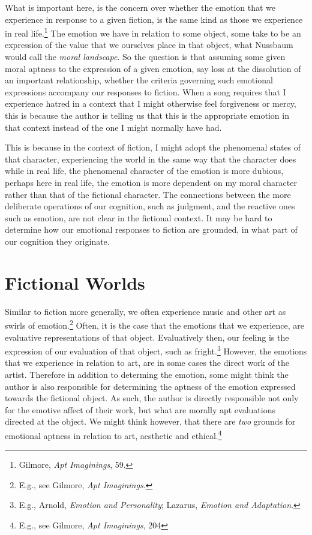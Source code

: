 \documentclass[phdthesis,12pt,final]{wuthesis}
\theoremstyle{definition}
\theoremstyle{definition}
\theoremstyle{definition}
\theoremstyle{definition}
\theoremstyle{remark}
\begin{document}
What is important here, is the concern over whether the emotion that we experience in response to a given fiction, is the same kind as those we experience in real life.\footnote{Gilmore, \emph{Apt {Imaginings}}, 59.} The emotion we have in relation to some object, some take to be an expression of the value that we ourselves place in that object, what Nussbaum would call the \emph{moral landscape}. So the question is that assuming some given moral aptness to the expression of a given emotion, say loss at the dissolution of an important relationship, whether the criteria governing such emotional expressions accompany our responses to fiction. When a song requires that I experience hatred in a context that I might otherwise feel forgiveness or mercy, this is because the author is telling us that this is the appropriate emotion in that context instead of the one I might normally have had.

This is because in the context of fiction, I might adopt the phenomenal states of that character, experiencing the world in the same way that the character does while in real life, the phenomenal character of the emotion is more dubious, perhaps here in real life, the emotion is more dependent on my moral character rather than that of the fictional character. The connections between the more deliberate operations of our cognition, such as judgment, and the reactive ones such as emotion, are not clear in the fictional context. It may be hard to determine how our emotional responses to fiction are grounded, in what part of our cognition they originate.

\section{Fictional Worlds}\label{fictional-worlds}

Similar to fiction more generally, we often experience music and other art as swirls of emotion.\footnote{E.g., see Gilmore, \emph{Apt {Imaginings}}.} Often, it is the case that the emotions that we experience, are evaluative representations of that object. Evaluatively then, our feeling is the expression of our evaluation of that object, such as fright.\footnote{E.g., Arnold, \emph{Emotion and {Personality}}; Lazarus, \emph{Emotion and Adaptation}.} However, the emotions that we experience in relation to art, are in some cases the direct work of the artist. Therefore in addition to determing the emotion, some might think the author is also responsible for determining the aptness of the emotion expressed towards the fictional object. As such, the author is directly responsible not only for the emotive affect of their work, but what are morally apt evaluations directed at the object. We might think however, that there are \emph{two} grounds for emotional aptness in relation to art, aesthetic and ethical.\footnote{E.g., see Gilmore, \emph{Apt {Imaginings}}, 204}
\end{document}
